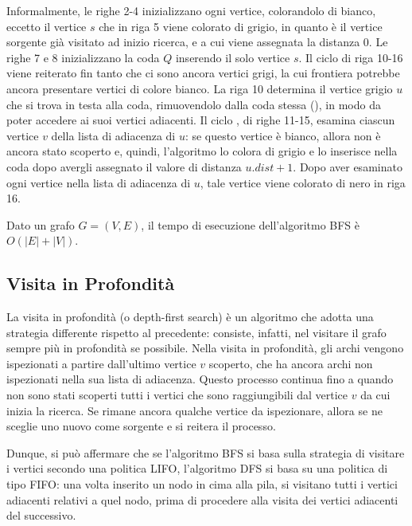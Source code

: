Informalmente, le righe 2-4 inizializzano ogni vertice, colorandolo di bianco, eccetto il vertice \(s\) che in riga 5 viene colorato di grigio, in quanto è il vertice sorgente già visitato ad inizio ricerca, e a cui viene assegnata la distanza 0. Le righe 7 e 8 inizializzano la coda \(Q\) inserendo il solo vertice \(s\). Il ciclo  di riga 10-16 viene reiterato fin tanto che ci sono ancora vertici grigi, la cui frontiera potrebbe ancora presentare vertici di colore bianco. La riga 10 determina il vertice grigio \(u\) che si trova in testa alla coda, rimuovendolo dalla coda stessa (), in modo da poter accedere ai suoi vertici adiacenti. Il ciclo , di righe 11-15, esamina ciascun vertice \(v\) della lista di adiacenza di \(u\): se questo vertice è bianco, allora non è ancora stato scoperto e, quindi, l'algoritmo lo colora di grigio e lo inserisce nella coda dopo avergli assegnato il valore di distanza \(u.dist + 1\). Dopo aver esaminato ogni vertice nella lista di adiacenza di \(u\), tale vertice viene colorato di nero in riga 16.

Dato un grafo \(G=(V, E)\), il tempo di esecuzione dell'algoritmo BFS è \(O(|E|+|V|)\).

\subsection{Visita in Profondità}
La visita in profondità (o depth-first search) è un algoritmo che adotta una strategia differente rispetto al precedente: consiste, infatti, nel visitare il grafo sempre più in profondità se possibile. Nella visita in profondità, gli archi vengono ispezionati a partire dall'ultimo vertice \(v\) scoperto, che ha ancora archi non ispezionati nella sua lista di adiacenza. Questo processo continua fino a quando non sono stati scoperti tutti i vertici che sono raggiungibili dal vertice \(v\) da cui inizia la ricerca. Se rimane ancora qualche vertice da ispezionare, allora se ne sceglie uno nuovo come sorgente e si reitera il processo. 

Dunque, si può affermare che se l'algoritmo BFS si basa sulla strategia di visitare i vertici secondo una politica LIFO, l'algoritmo DFS si basa su una politica di tipo FIFO: una volta inserito un nodo in cima alla pila, si visitano tutti i vertici adiacenti relativi a quel nodo, prima di procedere alla visita dei vertici adiacenti del successivo. 

